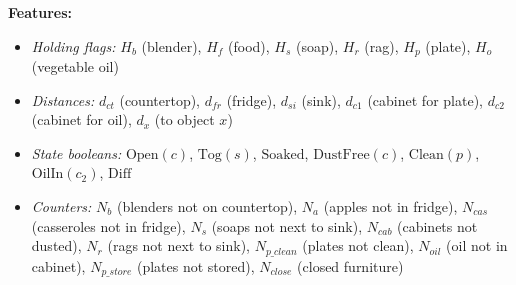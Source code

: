 \textbf{Features:}
\begin{itemize}[noitemsep]
    \item \textit{Holding flags:} $H_b$ (blender), $H_f$ (food), $H_s$ (soap), $H_r$ (rag), $H_p$ (plate), $H_o$ (vegetable oil)
    \item \textit{Distances:} $d_{ct}$ (countertop), $d_{fr}$ (fridge), $d_{si}$ (sink), $d_{c1}$ (cabinet for plate), $d_{c2}$ (cabinet for oil), $d_x$ (to object $x$)
    \item \textit{State booleans:} $\text{Open}(c)$, $\text{Tog}(s)$, $\text{Soaked}$, $\text{DustFree}(c)$, $\text{Clean}(p)$, $\text{OilIn}(c_2)$, $\text{Diff}$
    \item \textit{Counters:} $N_b$ (blenders not on countertop), $N_a$ (apples not in fridge), $N_{cas}$ (casseroles not in fridge), $N_s$ (soaps not next to sink), $N_{cab}$ (cabinets not dusted), $N_r$ (rags not next to sink), $N_{p\_clean}$ (plates not clean), $N_{oil}$ (oil not in cabinet), $N_{p\_store}$ (plates not stored), $N_{close}$ (closed furniture)
\end{itemize}




